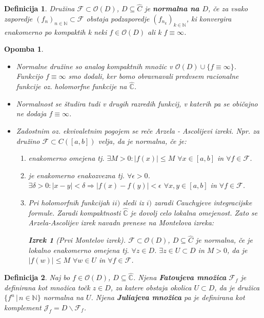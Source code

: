 \documentclass{article}
\newtheorem{definicija}{Definicija}
\newtheorem{opomba}{Opomba}
\newtheorem{izrek}{Izrek}
\newcommand{\C}{\mathbb{C}}
\newcommand{\N}{\mathbb{N}}
\newcommand{\F}{\mathcal{F}}
\newcommand{\Ho}{\mathcal{O}}
\begin{document}
\begin{definicija}
Družina $\F \subset \Ho(D)$, $D \subseteq \hat{C}$ je 
\textbf{normalna na $D$}, če za vsako zaporedje $(f_n)_{n\in \N} 
\subset \F$ obstaja podzaporedje $(f_{n_k})_{k\in\N}$, ki konvergira enakomerno po 
kompaktih k neki $f\in \Ho(D)$ ali k $f\equiv \infty$.
\end{definicija}

\begin{opomba}
\hfill
\begin{itemize}
\item Normalne družine so analog kompaktnih množic v $\Ho(D) \cup \{f \equiv \infty\}$. 
Funkcijo $f \equiv \infty$ smo dodali, ker bomo obravnavali predvsem racionalne 
funkcije oz. holomorfne funkcije na $\hat{\C}$.
\item Normalnost se študira tudi v drugih razredih funkcij, v katerih pa se običajno ne dodaja $f\equiv \infty$.
\item Zadostnim oz. ekvivaletnim pogojem se reče Arzela - Ascolijevi izreki. Npr. za družino $\F \subset C([a, b])$ velja, da je normalna, če je:
\begin{enumerate}
\item[i)] enakomerno omejena tj. $\exists M > 0: |f(x)| \leq M$ $\forall x\in [a, b]$ in $\forall f\in \F$.
\item[ii)] je enakomerno enakozvezna tj. $\forall \epsilon > 0$. $\exists \delta > 0: |x - y| < \delta \Longrightarrow |f(x) - f(y)| < \epsilon$ $\forall x, y\in [a, b]$ in $\forall f\in \F$.
\item[iii)] Pri holomorfnih funkcijah $ii)$ sledi iz $i)$ zaradi Cauchyjeve integracijske formule. Zaradi kompaktnosti $\hat{\C}$ je dovolj celo lokalna omejenost. Zato se Arzela-Ascolijev izrek navadn prenese na Montelova izreka:
\begin{izrek}[Prvi Montelov izrek]
$\F \subset \Ho(D)$, $D\subseteq \hat{C}$ je normalna, če je lokalno enakomerno omejena tj. $\forall z\in D$. $\exists z\in U \subset D $ in $M > 0$, da je $|f(w)| \leq M$ $\forall w\in U$ in $\forall f\in \F$.
\end{izrek}
\end{enumerate}
\end{itemize}
\end{opomba}

\begin{definicija}
Naj bo $f \in \Ho(D)$, $D\subseteq \hat{\C}$. Njena 
\textbf{Fatoujeva množica} $\F_f$ je definirana kot množica točk
 $z\in D$, za katere obstaja okolica $U\subset D$, da je družica 
 $\{f^n \,|\, n\in \N\}$ normalna na $U$. Njena 
 \textbf{Juliajeva množica} pa je definirana kot komplement 
 $\mathcal{J}_f = D\backslash \F_f$.
\end{definicija}
\end{document}
